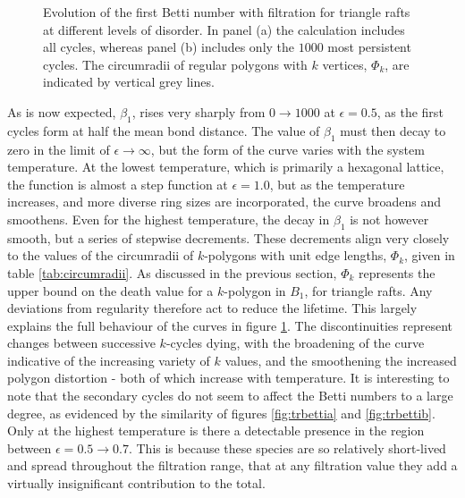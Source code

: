 \begin{figure}[tb]
	\caption{Evolution of the first Betti number with filtration for triangle rafts at different levels of disorder. In panel (a) the calculation includes all cycles, whereas panel (b) includes only the $1000$ most persistent cycles. The circumradii of regular polygons with $k$ vertices, $\Phi_k$, are indicated by vertical grey lines.}
	\label{fig:trbetti}
\end{figure}

As is now expected, $\beta_1$, rises very sharply from $0\rightarrow 1000$ at $\epsilon=0.5$, as the first cycles form at half the mean bond distance.
The value of $\beta_1$ must then decay to zero in the limit of $\epsilon\rightarrow \infty$, but the form of the curve varies with the system temperature.
At the lowest temperature, which is primarily a hexagonal lattice, the function is almost a step function at $\epsilon=1.0$, but as the temperature increases, and more diverse ring sizes are incorporated, the curve broadens and smoothens.
Even for the highest temperature, the decay in $\beta_1$ is not however smooth, but a series of stepwise decrements.
These decrements align very closely to the values of the circumradii of $k$\--polygons with unit edge lengths, $\Phi_k$, given in table \ref{tab:circumradii}.
As discussed in the previous section, $\Phi_k$ represents the upper bound on the death value for a $k$\--polygon in $B_1$, for triangle rafts. 
Any deviations from regularity therefore act to reduce the lifetime.
This largely explains the full behaviour of the curves in figure \ref{fig:trbetti}.
The discontinuities represent changes between successive $k$\--cycles dying, with the broadening of the curve indicative of the increasing variety of $k$ values, and the smoothening the increased polygon distortion \-- both of which increase with temperature.
It is interesting to note that the secondary cycles do not seem to affect the Betti numbers to a large degree, as evidenced by the similarity of figures \ref{fig:trbettia} and \ref{fig:trbettib}.
Only at the highest temperature is there a detectable presence in the region between $\epsilon=0.5\rightarrow0.7$.
This is because these species are so relatively short\--lived and spread throughout the filtration range, that at any filtration value they add a virtually insignificant contribution to the total. 


